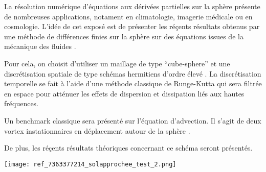 \documentclass[10pt]{article}
\begin{document}
La r\'esolution num\'erique d'\'equations aux d\'eriv\'ees partielles sur la sph\`ere pr\'esente de nombreuses applications, notament en climatologie, imagerie m\'edicale ou en cosmologie.
L'id\'ee de cet expos\'e est de pr\'esenter les r\'e\c{c}ents r\'esultats obtenus par une m\'ethode de diff\'erences finies sur la sph\`ere sur des \'equations issues de la m\'ecanique des fluides \cite{Brachet2016}.

Pour cela, on choisit d'utiliser un maillage de type ``cube-sphere'' \cite{Ronchi1996} et une discr\'etisation spatiale de type sch\'emas hermitiens d'ordre \'elev\'e \cite{Lele1991}. La discr\'etisation temporelle se fait \`a l'aide d'une m\'ethode classique de Runge-Kutta qui sera filtr\'ee en espace pour att\'enuer les effets de dispersion et dissipation li\'es aux hautes fr\'equences.

Un benchmark classique sera pr\'esent\'e sur l'\'equation d'advection. Il s'agit de deux vortex instationnaires en d\'eplacement autour de la sph\`ere \cite{Nair2008}.

De plus, les r\'e\c{c}ents r\'esultats th\'eoriques concernant ce sch\'ema seront pr\'esent\'es.

\begin{center}
\texttt{[image: ref\_7363377214\_solapprochee\_test\_2.png]}
\end{center}
\end{document}
